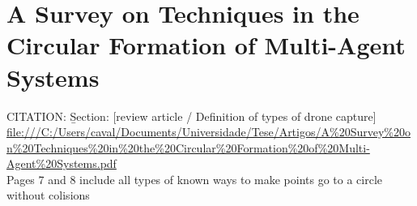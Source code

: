 \section{A Survey on Techniques in the Circular Formation of
Multi-Agent Systems
}\label{A Survey on Techniques in the Circular Formation of
Multi-Agent Systems
}
CITATION: \cite{electronics10232959} \b{Section: [review article / Definition of types of drone capture]}\\
\url{file:///C:/Users/caval/Documents/Universidade/Tese/Artigos/A%20Survey%20on%20Techniques%20in%20the%20Circular%20Formation%20of%20Multi-Agent%20Systems.pdf}\\

Pages 7 and 8 include all types of known ways to make points go to a circle without colisions